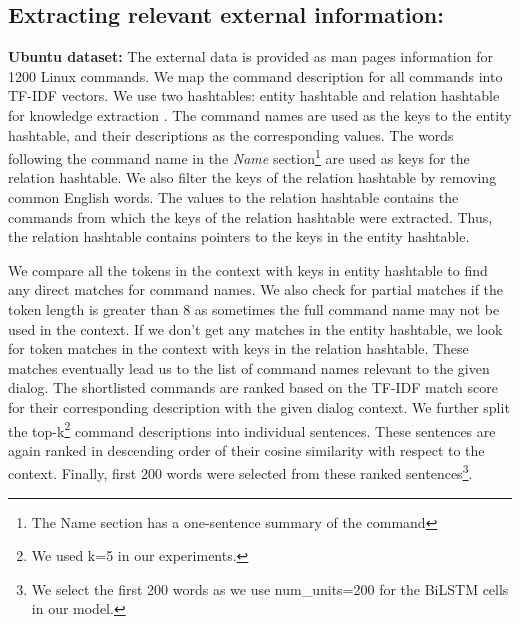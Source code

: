 \documentclass[letterpaper]{article} %
\begin{document}
\subsection{Extracting relevant external information:}
\textbf{Ubuntu dataset:} The external data is provided as man pages information for 1200 Linux commands.
We map the command description for all commands into TF-IDF vectors. We use two hashtables: entity hashtable and relation hashtable for knowledge extraction \cite{lowe2015incorporating}. The command names are used as the keys to the entity hashtable, and their descriptions as the corresponding values. The words following the command name in the \textit{Name} section\footnote{The Name section has a one-sentence summary of the command} are used as keys for the relation hashtable. We also filter the keys of the relation hashtable by removing common English words. The values to the relation hashtable contains the commands from which the keys of the relation hashtable were extracted. Thus, the relation hashtable contains pointers to the keys in the entity hashtable. 

We compare all the tokens in the context with keys in entity hashtable to find any direct matches for command names. We also check for partial matches if the token length is greater than 8 as sometimes the full command name may not be used in the context. If we don't get any matches in the entity hashtable, we look for token matches in the context with keys in the relation hashtable. 
These matches eventually lead us to the list of command names relevant to the given dialog. 
The shortlisted commands are ranked based on the TF-IDF match score for their corresponding description with the given dialog context. 
We further split the top-k\footnote{We used k=5 in our experiments.} command descriptions into individual sentences. These sentences are again ranked in descending order of their cosine similarity with respect to the context. Finally, first 200 words were selected from these ranked sentences\footnote{We select the first 200 words as we use num\_units=200 for the BiLSTM cells in our model.}.
\end{document}
